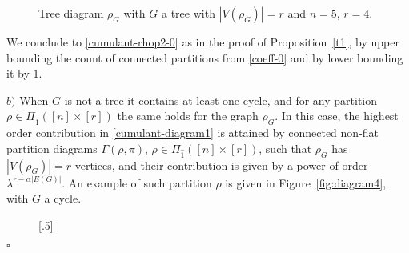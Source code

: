 \documentclass[12pt]{article}
\newenvironment{Proof}{\removelastskip\par\medskip
\noindent{\em Proof.} \rm}{\penalty-20\null\hfill$\square$\par\medbreak}
\numberwithin{equation}{section}
\begin{document}
\begin{Proof}
\begin{figure}[H]
{}%
\caption{Tree diagram $\rho_G$ with $G$ a tree with $|V(\rho_G)|=r$ and $n=5$, $r=4$.}
\label{fig:diagram4-0}
\end{figure}

\vskip-0.3cm

\noindent
 We conclude to \eqref{cumulant-rhop2-0} 
 as in the proof of Proposition~\ref{t1}, 
 by upper bounding the count of connected partitions from \eqref{coeff-0}
 and by lower bounding it by $1$. 

 \noindent
   $b)$ 
   When $G$ is not a tree it contains at least one cycle, and
   for any partition $\rho\in\Pi_{\widehat{1}} ([n]\times[r])$  
   the same holds for the graph $\rho_G$. 
In this case, the highest order contribution in
\eqref{cumulant-diagram1} is attained by connected non-flat partition diagrams 
$\Gamma ( \rho , \pi )$, $\rho\in\Pi_{\widehat{1}} ([n]\times[r])$,
such that $\rho_G$ has $|V(\rho_G)| = r$ vertices, 
and their contribution is given by a power of order $\lambda^{r-\alpha |E(G)|}$. 
 An example of such partition $\rho$ is given in Figure~\ref{fig:diagram4}, 
 with $G$ a cycle. 

\smallskip

\begin{figure}[H]
\captionsetup[subfigure]{font=footnotesize}
\centering
{}[.5\textwidth]{%
}
\end{figure}
\end{Proof}
\end{document}
